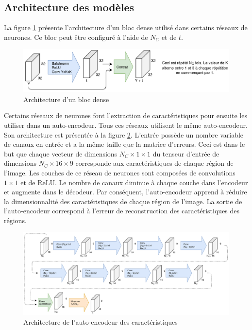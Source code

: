 \subsection{Architecture des modèles}
    La figure \ref{fig:architecture_bloc_dense} présente l'architecture d'un bloc dense utilisé dans certains réseaux de neurones. Ce bloc peut être configuré à l'aide de \(N_C\) et de \(t\).
    \bigskip
    
    \begin{figure}
        \centering
        \includegraphics[width=15cm]{images/Architecture_DenseBlock.png}
        \caption{Architecture d'un bloc dense}
        \label{fig:architecture_bloc_dense}
    \end{figure}

    Certains réseaux de neurones font l'extraction de caractéristiques pour ensuite les utiliser dans un auto-encodeur. Tous ces réseaux utilisent le même auto-encodeur. Son architecture est présentée à la figure  \ref{fig:architecture_autoencoder_caracteristique}. L'entrée possède un nombre variable de canaux en entrée et a la même taille que la matrice d'erreurs. Ceci est dans le but que chaque vecteur de dimensions \(N_C\times1\times1\) du tenseur d'entrée de dimensions \(N_C\times16\times9\) corresponde aux caractéristiques de chaque région de l'image. Les couches de ce réseau de neurones sont composées de convolutions \(1\times1\) et de ReLU. Le nombre de canaux diminue à chaque couche dans l'encodeur et augmente dans le décodeur. Par conséquent, l'auto-encodeur apprend à réduire la dimensionnalité des caractéristiques de chaque région de l'image. La sortie de l'auto-encodeur correspond à l'erreur de reconstruction des caractéristiques des régions.
    \begin{figure}
        \centering
        \includegraphics[width=16.6cm]{images/Architecture_FeatureAutoencoder.png}
        \caption{Architecture de l'auto-encodeur des caractéristiques}
        \label{fig:architecture_autoencoder_caracteristique}
    \end{figure}

